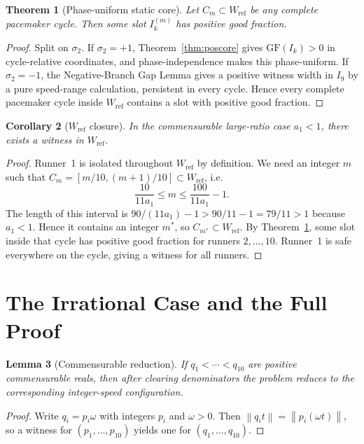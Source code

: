 \documentclass[12pt,a4paper]{amsart}
\newtheorem{theorem}{Theorem}[section]
\newtheorem{lemma}[theorem]{Lemma}
\newtheorem{corollary}[theorem]{Corollary}
\theoremstyle{definition}
\theoremstyle{remark}
\newcommand{\GF}{\mathrm{GF}}
\newcommand{\Wref}{W_{\mathrm{ref}}}
\newcommand{\norm}[1]{\left\|#1\right\|}
\begin{document}
\begin{theorem}[Phase-uniform static core]\label{thm:phasecore}
Let $C_m\subset\Wref$ be any complete pacemaker cycle. Then some slot $I_k^{(m)}$ has
positive good fraction.
\end{theorem}

\begin{proof}
Split on $\sigma_2$. If $\sigma_2=+1$, Theorem~\ref{thm:poscore} gives $\GF(I_k)>0$ in
cycle-relative coordinates, and phase-independence makes this phase-uniform. If
$\sigma_2=-1$, the Negative-Branch Gap Lemma gives a positive witness width in $I_9$ by
a pure speed-range calculation, persistent in every cycle. Hence every complete pacemaker
cycle inside $\Wref$ contains a slot with positive good fraction.
\end{proof}

\begin{corollary}[$\Wref$ closure]\label{cor:wref}
In the commensurable large-ratio case $a_1<1$, there exists a witness in $\Wref$.
\end{corollary}

\begin{proof}
Runner~1 is isolated throughout $\Wref$ by definition. We need an integer $m$ such that
$C_m=[m/10,(m+1)/10]\subset\Wref$, i.e.\
\[
  \frac{10}{11a_1} \le m \le \frac{100}{11a_1}-1.
\]
The length of this interval is $90/(11a_1)-1>90/11-1=79/11>1$ because $a_1<1$. Hence it
contains an integer $m^*$, so $C_{m^*}\subset\Wref$. By Theorem~\ref{thm:phasecore},
some slot inside that cycle has positive good fraction for runners $2,\ldots,10$. Runner~1
is safe everywhere on the cycle, giving a witness for all runners.
\end{proof}

\section{The Irrational Case and the Full Proof}

\begin{lemma}[Commensurable reduction]\label{lem:comred}
If $q_1<\cdots<q_{10}$ are positive commensurable reals, then after clearing denominators
the problem reduces to the corresponding integer-speed configuration.
\end{lemma}

\begin{proof}
Write $q_i=p_i\omega$ with integers $p_i$ and $\omega>0$. Then
$\norm{q_it}=\norm{p_i(\omega t)}$,
so a witness for $(p_1,\ldots,p_{10})$ yields one for $(q_1,\ldots,q_{10})$.
\end{proof}
\end{document}
